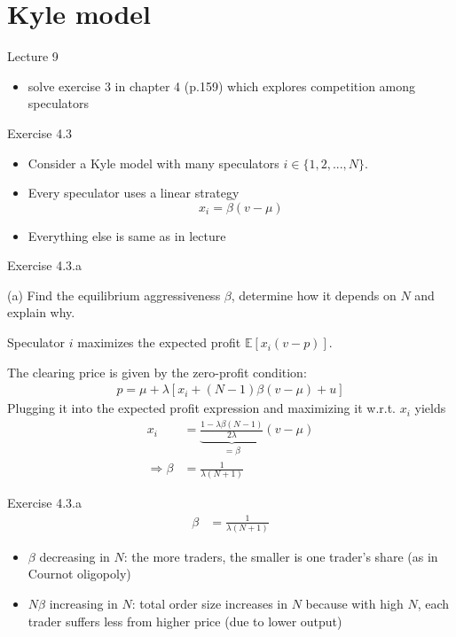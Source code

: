 \documentclass[english,10pt
,handout
,aspectratio=169
]{beamer}
\begin{document}
\section{Kyle model}

\begin{frame}{Lecture 9}
	\begin{itemize}
		\item solve exercise 3 in chapter 4 (p.159) which explores competition among speculators
	\end{itemize}
\end{frame}


\begin{frame}{Exercise 4.3}
	\begin{itemize}
		\item Consider a Kyle model with many speculators $i \in \{1,2,...,N\}$.
		\item Every speculator uses a linear strategy
		$$ x_i = \beta (v-\mu) $$
		\item Everything else is same as in lecture
	\end{itemize}
\end{frame}


\begin{frame}{Exercise 4.3.a}
	\begin{exampleblock}{}
		(a) Find the equilibrium aggressiveness $\beta$, determine how it depends on $N$ and explain why.
	\end{exampleblock}
	
	\pause
	
	Speculator $i$ maximizes the expected profit $\mathbb{E} [x_i (v-p)]$.
	
	The clearing price is given by the zero-profit condition:
	\begin{align*}
		p = \mu + \lambda [x_i + (N-1) \beta (v-\mu) + u]
	\end{align*}
	Plugging it into the expected profit expression and maximizing it w.r.t. $x_i$ yields
	\begin{align*}
		x_i &= \underbrace{\frac{1 - \lambda \beta (N-1)}{2 \lambda}}_{=\beta} (v-\mu)
		\\
		\Rightarrow
		\beta &= \frac{1}{\lambda (N+1)}
	\end{align*}
\end{frame}


\begin{frame}{Exercise 4.3.a}
	\begin{align*}
	\beta &= \frac{1}{\lambda (N+1)}
	\end{align*}
	
	\begin{itemize}
		\item $\beta$ decreasing in $N$: the more traders, the smaller is one trader's share (as in Cournot oligopoly)
		\item $N \beta$ increasing in $N$: total order size increases in $N$ because with high $N$, each trader suffers less from higher price (due to lower output)
	\end{itemize}
\end{frame}
\end{document}
